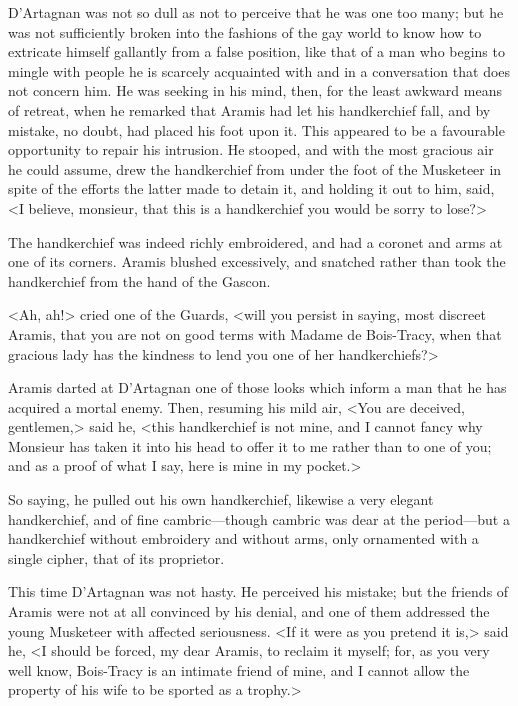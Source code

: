 D'Artagnan was not so dull as not to perceive that he was one too many; but he was not sufficiently broken into the fashions of the gay world to know how to extricate himself gallantly from a false position, like that of a man who begins to mingle with people he is scarcely acquainted with and in a conversation that does not concern him. He was seeking in his mind, then, for the least awkward means of retreat, when he remarked that Aramis had let his handkerchief fall, and by mistake, no doubt, had placed his foot upon it. This appeared to be a favourable opportunity to repair his intrusion. He stooped, and with the most gracious air he could assume, drew the handkerchief from under the foot of the Musketeer in spite of the efforts the latter made to detain it, and holding it out to him, said, <I believe, monsieur, that this is a handkerchief you would be sorry to lose?> 

The handkerchief was indeed richly embroidered, and had a coronet and arms at one of its corners. Aramis blushed excessively, and snatched rather than took the handkerchief from the hand of the Gascon. 

<Ah, ah!> cried one of the Guards, <will you persist in saying, most discreet Aramis, that you are not on good terms with Madame de Bois-Tracy, when that gracious lady has the kindness to lend you one of her handkerchiefs?> 

Aramis darted at D'Artagnan one of those looks which inform a man that he has acquired a mortal enemy. Then, resuming his mild air, <You are deceived, gentlemen,> said he, <this handkerchief is not mine, and I cannot fancy why Monsieur has taken it into his head to offer it to me rather than to one of you; and as a proof of what I say, here is mine in my pocket.> 

So saying, he pulled out his own handkerchief, likewise a very elegant handkerchief, and of fine cambric—though cambric was dear at the period—but a handkerchief without embroidery and without arms, only ornamented with a single cipher, that of its proprietor. 

This time D'Artagnan was not hasty. He perceived his mistake; but the friends of Aramis were not at all convinced by his denial, and one of them addressed the young Musketeer with affected seriousness. <If it were as you pretend it is,> said he, <I should be forced, my dear Aramis, to reclaim it myself; for, as you very well know, Bois-Tracy is an intimate friend of mine, and I cannot allow the property of his wife to be sported as a trophy.> 


